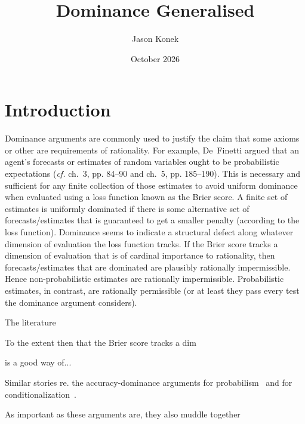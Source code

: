 \documentclass[11pt]{article}
\title{Dominance Generalised}
\author{Jason Konek}
\date{October 2026}
\theoremstyle{definition}
\begin{document}
\maketitle

\begin{abstract}
\end{abstract}


\section{Introduction}


Dominance arguments are commonly used to justify the claim that some axioms or other are requirements of rationality. For example, De~Finetti argued that an agent's forecasts or estimates of random variables ought to be probabilistic expectations (\textit{cf.} ch.~3, pp. 84–90 and ch.~5, pp. 185–190). This is necessary and sufficient for any finite collection of those estimates to avoid uniform dominance when evaluated using a loss function known as the Brier score. A finite set of estimates is uniformly dominated if there is some alternative set of forecasts/estimates that is guaranteed to get a smaller penalty (according to the loss function). Dominance seems to indicate a structural defect along whatever dimension of evaluation the loss function tracks. If the Brier score tracks a dimension of evaluation that is of cardinal importance to rationality, then forecasts/estimates that are dominated are plausibly rationally impermissible. Hence non-probabilistic estimates are rationally impermissible. Probabilistic estimates, in contrast, are rationally permissible (or at least they pass every test the dominance argument considers).



The literature



\newpage
To the extent then that the Brier score tracks a dim


is a good way of...

Similar stories re. the accuracy-dominance arguments for probabilism~\cite{Joyce,Predd,SSK09,Pettigrew,Nielsen} and for conditionalization~\cite{BP20,Nielsen21}.

As important as these arguments are, they also muddle together




\newpage
\end{document}
